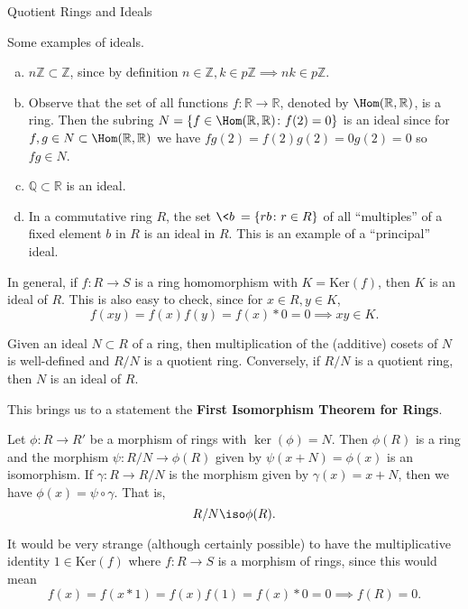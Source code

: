 \begin{section}{Quotient Rings and Ideals}
\begin{ex}
Some examples of ideals.
\begin{enumerate}[(a)]
\item $n\mathbb{Z} \subset \mathbb{Z}$, since by definition $n \in \mathbb{Z}, k \in p\mathbb{Z} \implies nk \in p\mathbb{Z}.$
\item Observe that the set of all functions $f \colon \mathbb{R} \to \mathbb{R}$, denoted by $\Hom(\mathbb{R},\mathbb{R})$, is a ring. Then the subring
$N = \{f \in \Hom(\mathbb{R},\mathbb{R}) \colon f(2) = 0\}$ is an ideal since for $f,g \in N \subset \Hom(\mathbb{R},\mathbb{R})$ we have $fg(2) = f(2)g(2) = 0g(2) = 0$ so $fg \in N$.
\item $\mathbb{Q} \subset \mathbb{R}$ is an ideal.
\item   In a commutative ring $R$, the set $ \<b\> = \{rb \colon r \in R\}$ of all ``multiples'' of a fixed element $b$ in $R$ is an ideal in $R$. This is an example of a ``principal'' ideal.
\end{enumerate}
\end{ex}

\begin{prop}
  In general, if $f \colon R \to S$ is a ring homomorphism with $K = \text{Ker}(f)$, then $K$ is an ideal of $R$. This is also easy to check, since for $x \in R, y \in K$, 
  $$ f(xy) = f(x)f(y) = f(x)*0 = 0 \implies xy \in K.$$
\end{prop}

\begin{prop}
Given an ideal $N \subset R$ of a ring, then multiplication of the (additive) cosets of $N$ is well-defined and $R/N$ is a quotient ring. Conversely, if $R/N$ is a quotient ring, then $N$ is an ideal of $R$.
\end{prop}

This brings us to a statement the {\bf First Isomorphism Theorem for Rings}.

\begin{thm}
Let $\phi \colon R \to R'$ be a morphism of rings with $\ker(\phi) = N$. Then $\phi(R)$ is a ring and the morphism $\psi \colon R/N \to \phi(R)$ given by $\psi(x + N) = \phi(x)$ is an isomorphism. If $\gamma \colon R \to R/N$ is the morphism given by $\gamma(x) = x + N$, then we have $\phi(x) = \psi \circ \gamma$. That is, $$R/N \iso \phi(R).$$
\end{thm}

\begin{rmk}
It would be very strange (although certainly possible) to have the multiplicative identity $1 \in \text{Ker}(f)$ where $f \colon R \to S$ is a morphism of rings, since this would mean
$$f(x) = f(x*1) = f(x)f(1) = f(x)*0 = 0 \implies f(R) = 0.$$
\end{rmk}


\end{section}
